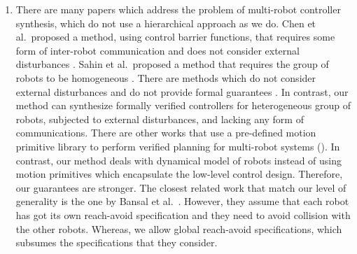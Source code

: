 \begin{enumerate}[(1)]
	\item There are many papers which address the problem of multi-robot controller synthesis, which do not use a hierarchical approach as we do.
	Chen et al.\ proposed a method, using control barrier functions, that requires some form of inter-robot communication and does not consider external disturbances \cite{Chen2018cbf}.
	Sahin et al.\ proposed a method that requires the group of robots to be homogeneous \cite{Shahin2017cltl}.
	There are methods which do not consider external disturbances and do not provide formal guarantees \cite{jackson2020scalable}.
	In contrast, our method can synthesize formally verified controllers for heterogeneous group of robots, subjected to external disturbances, and lacking any form of communications. There are other works that use a pre-defined motion primitive library to perform verified planning for multi-robot systems (\cite{saha2016implan,BanusicMPSZ19pgcd}). In contrast, our method deals with dynamical model of robots instead of using motion primitives which encapsulate the low-level control design. Therefore, our guarantees are stronger.
	The closest related work that match our level of generality is the one by Bansal et al.\ \cite{bansal2017safe}.
	However, they assume that each robot has got its own reach-avoid specification and they need to avoid collision with the other robots.
	Whereas, we allow global reach-avoid specifications, which subsumes the specifications that they consider.

\end{enumerate}
